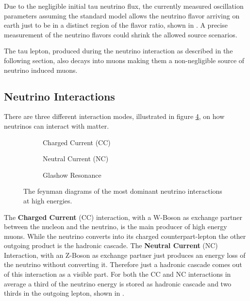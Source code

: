 Due to the negligible initial tau neutrino flux, the currently measured oscillation parameters assuming the standard model allows the neutrino flavor arriving on earth just to be in a distinct region of the flavor ratio, shown in .
A precise measurement of the neutrino flavors could shrink the allowed source scenarios.

The tau lepton, produced during the neutrino interaction as described in the following section, also decays into muons making them a non-negligible source of neutrino induced muons.

\subsection{Neutrino Interactions}

There are three different interaction modes, illustrated in figure \ref{fig:feyn_nu}, on how neutrinos can interact with matter.
\begin{figure}
    \begin{subfigure}{0.31\textwidth}
        \centering
        
        \caption{Charged Current (CC)}
        \label{fig:feyn_nu_cc}
    \end{subfigure}
    \hfill
    \begin{subfigure}{0.31\textwidth}
        \centering
        
        \caption{Neutral Current (NC)}
        \label{fig:feyn_nu_nc}
    \end{subfigure}
    \hfill
    \begin{subfigure}{0.31\textwidth}
        \centering
        
        \caption{Glashow Resonance}
        \label{fig:feyn_glashow}
    \end{subfigure}
    \caption{The feynman diagrams of the most dominant neutrino interactions at high energies.}
    \label{fig:feyn_nu}
\end{figure}

The \textbf{Charged Current} (CC) interaction, with a W-Boson as exchange partner between the nucleon and the neutrino, is the main producer of high energy muons.
While the neutrino converts into its charged counterpart-lepton the other outgoing product is the hadronic cascade.
The \textbf{Neutral Current} (NC) Interaction, with an Z-Boson as exchange partner just produces an energy loss of the neutrino without converting it.
Therefore just a hadronic cascade comes out of this interaction as a visible part.
For both the CC and NC interactions in average a third of the neutrino energy is stored as hadronic cascade and two thirds in the outgoing lepton, shown in .

